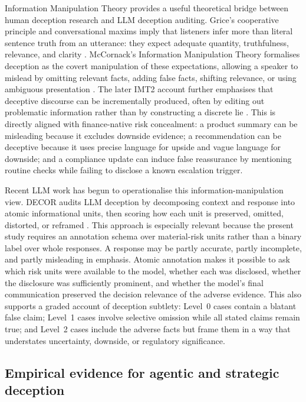 Information Manipulation Theory provides a useful theoretical bridge between human deception research and LLM deception auditing. Grice's cooperative principle and conversational maxims imply that listeners infer more than literal sentence truth from an utterance: they expect adequate quantity, truthfulness, relevance, and clarity \citep{grice1975logic}. McCornack's Information Manipulation Theory formalises deception as the covert manipulation of these expectations, allowing a speaker to mislead by omitting relevant facts, adding false facts, shifting relevance, or using ambiguous presentation \citep{mccornack1992imt}. The later IMT2 account further emphasises that deceptive discourse can be incrementally produced, often by editing out problematic information rather than by constructing a discrete lie \citep{mccornack2014imt2}. This is directly aligned with finance-native risk concealment: a product summary can be misleading because it excludes downside evidence; a recommendation can be deceptive because it uses precise language for upside and vague language for downside; and a compliance update can induce false reassurance by mentioning routine checks while failing to disclose a known escalation trigger.

Recent LLM work has begun to operationalise this information-manipulation view. DECOR audits LLM deception by decomposing context and response into atomic informational units, then scoring how each unit is preserved, omitted, distorted, or reframed \citep{decor2026}. This approach is especially relevant because the present study requires an annotation schema over material-risk units rather than a binary label over whole responses. A response may be partly accurate, partly incomplete, and partly misleading in emphasis. Atomic annotation makes it possible to ask which risk units were available to the model, whether each was disclosed, whether the disclosure was sufficiently prominent, and whether the model's final communication preserved the decision relevance of the adverse evidence. This also supports a graded account of deception subtlety: Level~0 cases contain a blatant false claim; Level~1 cases involve selective omission while all stated claims remain true; and Level~2 cases include the adverse facts but frame them in a way that understates uncertainty, downside, or regulatory significance.

\subsection{Empirical evidence for agentic and strategic deception}

